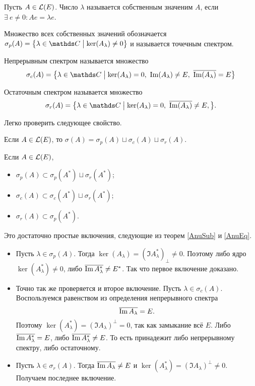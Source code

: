 \begin{Def}
  Пусть $A\in\mathcal L(E)$. Число $\lambda$ называется собственным значеним $A$, если $\exists\ e\ne 0\colon Ae = \lambda e$.

Множество всех собственных значений обозначается $\sigma_p(A) = \big\{\lambda\in\C\bigm| \ker(A_\lambda)\ne0\big\}$ и называется точечным спектром.

Непрерывным спектром называется множество
\[
  \sigma_c(A) = \big\{\lambda\in\C\bigm|
	\ker(A_\lambda)=0,\ 
	\Im(A_\lambda)\ne E,\ 
	\ol{\Im(A_\lambda)} = E\big\}
\]

Остаточным спектром называется множество
\[
  \sigma_r(A) = \big\{\lambda\in\C\bigm|
	\ker(A_\lambda)=0,\ 
	\ol{\Im(A_\lambda)}\ne E,\big\}.
\]
\end{Def}

Легко проверить следующее свойство.
\begin{Ut}
  Если $A\in \mathcal L(E)$, то $\sigma(A) = \sigma_p(A)\sqcup \sigma_c(A)\sqcup \sigma_r(A)$.
\end{Ut}

\begin{Ut}
  Если $A\in\mathcal L(E)$, 
\begin{itemize}
\item 
$\sigma_p(A)\subset \sigma_p(A^*)\sqcup \sigma_r(A^*)$;
\item 
$\sigma_c(A)\subset \sigma_c(A^*)\sqcup \sigma_r(A^*)$;
\item $\sigma_r(A)\subset \sigma_p(A^*)$.
\end{itemize}
\end{Ut}
\begin{Proof}
  Это достаточно простые включения, следующие из теорем \ref{AnuSub} и \ref{AnuEq}.
\begin{itemize}
\item Пусть $\lambda\in \sigma_p(A)$. Тогда $\ker(A_\lambda) = (\Im A^*_\lambda)_\perp\ne0$. Поэтому либо ядро $\ker(A^*_\lambda) \ne 0$, либо $\overline{\mathop{\mathrm{Im}} A^*_\lambda}\ne E^*$. Так что первое включение доказано.
\item Точно так же проверяется и второе включение. Пусть $\lambda\in \sigma_c(A)$. Воспользуемся равенством из определения непрерывного спектра
\[
  \overline{\mathop{\mathrm{Im}} A_\lambda} = E.
\]
Поэтому $\ker(A^*_\lambda) = (\Im A_\lambda)^\perp = 0$, так как замыкание всё $E$. Либо $\overline{\mathop{\mathrm{Im}} A^*_\lambda} = E$, либо $\overline{\mathop{\mathrm{Im}} A^*_\lambda} \ne E$. То есть принадежит либо непрерывному спектру, либо остаточному.
\item Пусть $\lambda\in \sigma_r(A)$. Тогда $\overline{\mathop{\mathrm{Im}} A_\lambda}\ne E$ и $\ker(A^*_\lambda) = (\Im A_\lambda)^\perp \ne0$. Получаем последнее включение.
\end{itemize}
\end{Proof}

